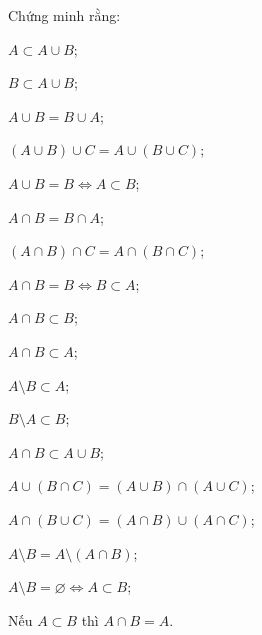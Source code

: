 \begin{bt}%
	Chứng minh rằng: 
	\begin{listEX}[2]
		 \item $ A \subset A \cup B$;
		 \item $ B \subset A \cup B$;
		\item $A \cup B  = B \cup A$;
		\item $(A \cup B) \cup C  = A \cup (B \cup C)$;
		\item $A  \cup B = B \Leftrightarrow A \subset B$;
		\item $A \cap B  = B \cap A$;
		\item $(A \cap B) \cap C = A \cap (B \cap C)$; 
		\item $A \cap B = B  \Leftrightarrow B \subset A$;
		\item $A \cap B  \subset B$;
		\item $A \cap B \subset A$; 
		\item $A \setminus B \subset  A$;
		\item $B \setminus A \subset B$; 
		\item  $A \cap B \subset A \cup B$;
		\item $A \cup (B \cap C) = (A \cup  B) \cap (A \cup C)$;
		\item $A \cap (B \cup C) = (A \cap B) \cup  (A \cap C)$;
		\item $A  \setminus B = A \setminus (A \cap B)$;
		\item $A \setminus B = \varnothing \Leftrightarrow A \subset B$; 
		\item Nếu $A \subset B$ thì $A \cap B =  A$.
	\end{listEX}
\end{bt}
